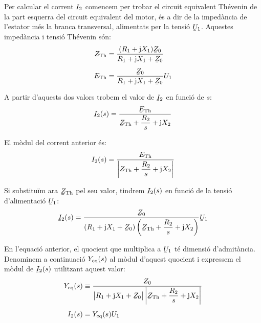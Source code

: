 Per calcular el corrent $\cmplx{I}_2$ comencem per trobar el circuit equivalent Thévenin de la part esquerra del circuit equivalent del motor, és a dir de la impedància de l'estator més la branca transversal, alimentats per la tensió $\cmplx{U}_1$. Aquestes impedància i tensió Thévenin són:
\begin{subequations}
\begin{align}
    \cmplx{Z}\ped{Th} &= \frac{(R_1 + \ju X_1) \cmplx{Z}_0}{R_1 + \ju X_1 + \cmplx{Z}_0} \label{eq:mot-ZTh} \\[1ex]
    \cmplx{E}\ped{Th} &= \frac{\cmplx{Z}_0}{R_1 + \ju X_1 + \cmplx{Z}_0} \cmplx{U}_1 \label{eq:mot-UTh}
\end{align}
\end{subequations}

A partir d'aquests dos valors trobem el valor de $\cmplx{I}_2$ en funció de $s$:
\begin{equation}
    \cmplx{I}_2(s) = \frac{\cmplx{E}\ped{Th}}{\cmplx{Z}\ped{Th} + \dfrac{R_2}{s} + \ju X_2}
\end{equation}

El mòdul del corrent anterior és:
\begin{equation}
    I_2(s) = \frac{E\ped{Th}}{\left|\cmplx{Z}\ped{Th} + \dfrac{R_2}{s} + \ju X_2\right|} \label{eq-mot-I2}
\end{equation}

Si substituïm  ara $\cmplx{Z}\ped{Th}$ pel seu valor, tindrem $\cmplx{I}_2(s)$ en funció de la tensió d'alimentació $\cmplx{U}_1$:
\begin{equation}
    \cmplx{I}_2(s) = \frac{\cmplx{Z}_0}{(R_1 + \ju X_1 + \cmplx{Z}_0)\left(\cmplx{Z}\ped{Th} + \dfrac{R_2}{s} + \ju X_2\right)} \cmplx{U}_1
\end{equation}

En l'equació anterior, el quocient que multiplica a $\cmplx{U}_1$ té dimensió d'admitància. Denominem a continuació $Y_\mathrm{eq}(s)$ al mòdul d'aquest quocient i expressem el mòdul de $\cmplx{I}_2(s)$ utilitzant aquest valor:
\begin{subequations}
\begin{align}
    Y\ped{eq}(s) &\equiv \frac{Z_0}{\big|R_1 + \ju X_1 + \cmplx{Z}_0\big| \left|\cmplx{Z}\ped{Th} + \dfrac{R_2}{s} + \ju X_2\right|}  \\[1ex]
    I_2(s) &= Y\ped{eq}(s) U_1
\end{align}
\end{subequations}

